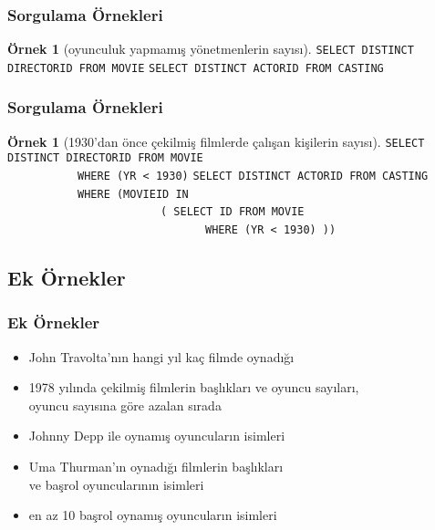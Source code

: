 \documentclass[dvipsnames]{beamer}
\theoremstyle{definition}
\theoremstyle{example}
\newtheorem{ornek}[theorem]{Örnek}
\theoremstyle{plain}
\begin{document}
\begin{frame}[fragile]
  \frametitle{Sorgulama Örnekleri}

  \begin{ornek}[oyunculuk yapmamış yönetmenlerin sayısı]
\lstinline!SELECT DISTINCT DIRECTORID FROM MOVIE!
\lstinline!SELECT DISTINCT ACTORID FROM CASTING!
  \end{ornek}
\end{frame}

\begin{frame}[fragile]
  \frametitle{Sorgulama Örnekleri}

  \begin{ornek}[1930'dan önce çekilmiş filmlerde çalışan kişilerin sayısı]
\lstinline!SELECT DISTINCT DIRECTORID FROM MOVIE!\\
~~~~~~~~~~~\lstinline!WHERE (YR < 1930)!
\lstinline!SELECT DISTINCT ACTORID FROM CASTING!\\
~~~~~~~~~~~\lstinline!WHERE (MOVIEID IN!\\
~~~~~~~~~~~~~~~~~~~~~~~~\lstinline!( SELECT ID FROM MOVIE!\\
~~~~~~~~~~~~~~~~~~~~~~~~~~~~~~~\lstinline!WHERE (YR < 1930) ))!
  \end{ornek}
\end{frame}

\subsection*{Ek Örnekler}

\begin{frame}
  \frametitle{Ek Örnekler}

  \begin{itemize}
    \item John Travolta'nın hangi yıl kaç filmde oynadığı
    \item 1978 yılında çekilmiş filmlerin başlıkları ve oyuncu sayıları,\\
      oyuncu sayısına göre azalan sırada
    \item Johnny Depp ile oynamış oyuncuların isimleri
    \item Uma Thurman'ın oynadığı filmlerin başlıkları\\
      ve başrol oyuncularının isimleri
    \item en az 10 başrol oynamış oyuncuların isimleri
  \end{itemize}
\end{frame}
\end{document}
